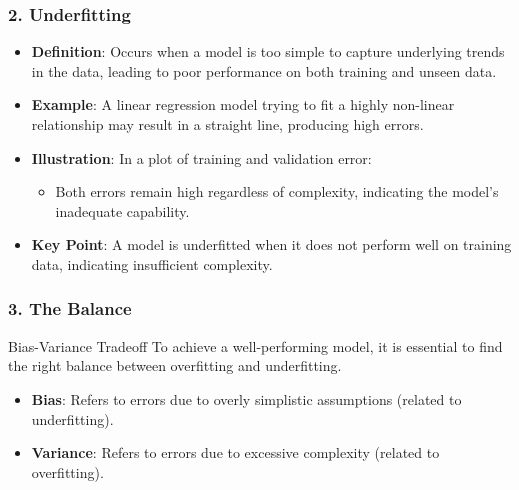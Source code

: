 \documentclass[aspectratio=169]{beamer}
\begin{document}
\begin{frame}[fragile]
  \frametitle{2. Underfitting}
  \begin{itemize}
    \item \textbf{Definition}: Occurs when a model is too simple to capture underlying 
    trends in the data, leading to poor performance on both training and unseen data.
    
    \item \textbf{Example}: A linear regression model trying to fit a highly non-linear 
    relationship may result in a straight line, producing high errors.
    
    \item \textbf{Illustration}: In a plot of training and validation error:
    \begin{itemize}
      \item Both errors remain high regardless of complexity, indicating the model's 
      inadequate capability.
    \end{itemize}
    
    \item \textbf{Key Point}: A model is underfitted when it does not perform well on 
    training data, indicating insufficient complexity.
  \end{itemize}
\end{frame}

\begin{frame}[fragile]
  \frametitle{3. The Balance}
  \begin{block}{Bias-Variance Tradeoff}
    To achieve a well-performing model, it is essential to find the right balance 
    between overfitting and underfitting.
  \end{block}
  \begin{itemize}
    \item \textbf{Bias}: Refers to errors due to overly simplistic assumptions 
    (related to underfitting).
    
    \item \textbf{Variance}: Refers to errors due to excessive complexity 
    (related to overfitting).
  \end{itemize}
\end{frame}
\end{document}
